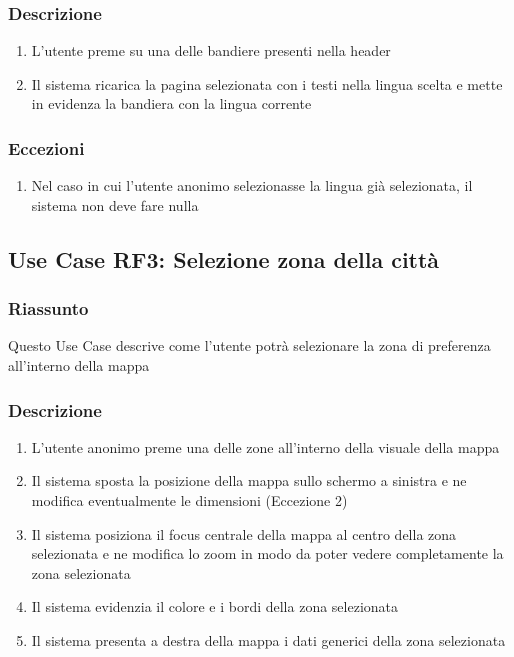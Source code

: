         \subsubsection{Descrizione}
            \begin{enumerate}
                \item L'utente preme su una delle bandiere presenti nella header
                \item Il sistema ricarica la pagina selezionata con i testi nella lingua scelta e mette in evidenza la bandiera con la lingua corrente
            \end{enumerate}
        \subsubsection{Eccezioni}
            \begin{enumerate}
                \item Nel caso in cui l'utente anonimo selezionasse la lingua già selezionata, il sistema non deve fare nulla
            \end{enumerate}

    \subsection{Use Case RF3: Selezione zona della città}
        \subsubsection{Riassunto}
            Questo Use Case descrive come l'utente potrà selezionare la zona di preferenza all'interno della mappa
        \subsubsection{Descrizione}
            \begin{enumerate}
                \item L'utente anonimo preme una delle zone all'interno della visuale della mappa
                \item Il sistema sposta la posizione della mappa sullo schermo a sinistra e ne modifica eventualmente le dimensioni (Eccezione 2)
                \item Il sistema posiziona il focus centrale della mappa al centro della zona selezionata e ne modifica lo zoom in modo da poter vedere completamente la zona selezionata
                \item Il sistema evidenzia il colore e i bordi della zona selezionata
                \item Il sistema presenta a destra della mappa i dati generici della zona selezionata
            \end{enumerate}
